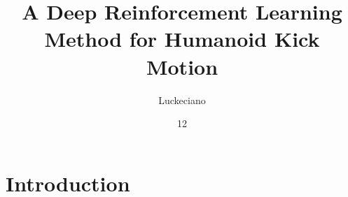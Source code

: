 \documentclass[tg, eng, dv]{ita}    %
\author{Luckeciano}{Carvalho Melo}
\title{A Deep Reinforcement Learning Method for Humanoid Kick Motion}
\date{12}{JUNE}{2018}
\begin{document}
\maketitle
%
%

 

%


%

\begin{englishabstract}
\noindent

\end{englishabstract}

\listoffigures %

\listoftables %



\tableofcontents

\mainmatter

\chapter{Introduction}\label{ch:intro}

\end{document}
